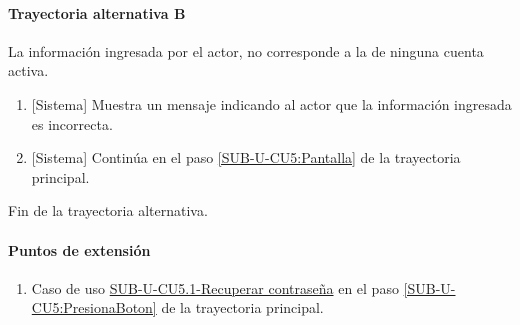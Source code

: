 \paragraph{Trayectoria alternativa B} \label{SUB-U-CU5:TB}
	La información ingresada por el actor, no corresponde a la de ninguna cuenta activa.
	\begin{enumerate}[label=A\arabic*.]
		\item {[Sistema]} Muestra un mensaje indicando al actor que la información ingresada es incorrecta.
		\item {[Sistema]} Continúa en el paso \ref{SUB-U-CU5:Pantalla} de la trayectoria principal.
	\end{enumerate}
	Fin de la trayectoria alternativa.

\paragraph{Puntos de extensión} \label{SUB-U-CU5:PE}
\begin{enumerate}[label=PE\arabic*.]
	\item Caso de uso \hyperref[SUB-U-CU5.1]{SUB-U-CU5.1-Recuperar contraseña} en el paso \ref{SUB-U-CU5:PresionaBoton} de la trayectoria principal.
\end{enumerate}
